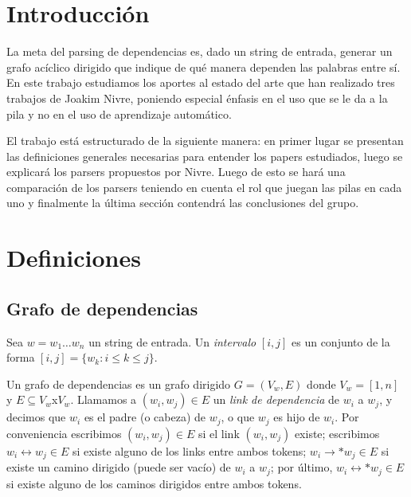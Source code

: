 \documentclass[11pt,a4paper,spanish]{article}
\begin{document}



\maketitle

\tableofcontents

\newpage
\section{Introducción}

La meta del parsing de dependencias es, dado un string de entrada, generar un grafo acíclico dirigido que indique de qué manera dependen las palabras entre sí. En este trabajo estudiamos los aportes al estado del arte que han realizado tres trabajos de Joakim Nivre, poniendo especial énfasis en el uso que se le da a la pila y no en el uso de aprendizaje automático. 

El trabajo está estructurado de la siguiente manera: en primer lugar se presentan las definiciones generales necesarias para entender los papers estudiados, luego se explicará los parsers propuestos 
por Nivre. Luego de esto se hará una comparación de los parsers teniendo en cuenta el rol que juegan 
las pilas en cada uno y finalmente la última sección contendrá las conclusiones del grupo. 

\newpage
\section{Definiciones}

\subsection{Grafo de dependencias}
 
Sea $w = w_1\dots w_n$ un string de entrada. Un \emph{intervalo} $[i,j]$ es un conjunto de la forma 
$[i,j] = \{w_k : i\leq  k\leq  j\}$. 

Un grafo de dependencias es un grafo dirigido $G = (V_w, E)$ donde $V_w = [1,n]$ y $E\subseteq 
V_w$x$V_w$. Llamamos a $(w_i,w_j)\in E$ un \emph{link de dependencia} de $w_i$ a $w_j$, y decimos que 
$w_i$ es el padre (o cabeza) de $w_j$, o que $w_j$ es hijo de $w_i$. Por conveniencia escribimos 
$(w_i,w_j)\in E$ si el link $(w_i,w_j)$ existe; escribimos $w_i\leftrightarrow  w_j\in E$ si existe alguno de los links entre ambos tokens; $w_i\rightarrow * w_j\in E$ si existe un camino dirigido 
(puede ser vacío) de $w_i$ a $w_j$; por último, $w_i\leftrightarrow * w_j\in E$ si existe alguno de los caminos dirigidos entre ambos tokens. 
\end{document}
